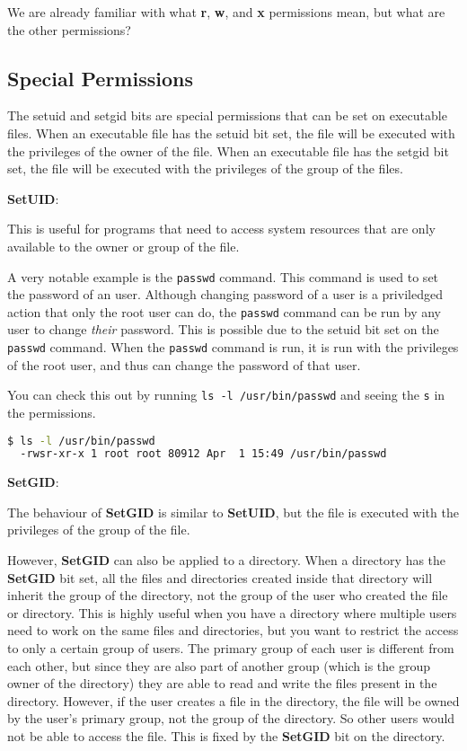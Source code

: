 We are already familiar with what
\textbf{r},
\textbf{w}, and
\textbf{x}
permissions mean, but what are the other permissions?

\subsection{Special Permissions}

\begin{definition}
  The setuid and setgid bits are special permissions that can be set on executable files.
  When an executable file has the setuid bit set, the file will be executed with the privileges of the owner of the file.
  When an executable file has the setgid bit set, the file will be executed with the privileges of the group of the files.
\end{definition}

\textbf{SetUID}:

This is useful for programs that need to access system resources that are only available to the owner or group of the file.

A very notable example is the \lstinline|passwd| command.
This command is used to set the password of an user.
Although changing password of a user is a priviledged action that only the root user can do, the \lstinline|passwd| command can be run by any user to change \textit{their} password.
This is possible due to the setuid bit set on the \lstinline|passwd| command.
When the \lstinline|passwd| command is run, it is run with the privileges of the root user, and thus can change the password of that user.

You can check this out by running \lstinline|ls -l /usr/bin/passwd| and seeing the \lstinline|s| in the permissions.

\begin{lstlisting}[language=bash]
  $ ls -l /usr/bin/passwd
  -rwsr-xr-x 1 root root 80912 Apr  1 15:49 /usr/bin/passwd
\end{lstlisting}

\textbf{SetGID}:

The behaviour of \textbf{SetGID} is similar to \textbf{SetUID}, but the file is executed with the privileges of the group of the file.

However, \textbf{SetGID} can also be applied to a directory.
When a directory has the \textbf{SetGID} bit set, all the files and directories created inside that directory will inherit the group of the directory, not the group of the user who created the file or directory.
This is highly useful when you have a directory where multiple users need to work on the same files and directories, but you want to restrict the access to only a certain group of users.
The primary group of each user is different from each other, but since they are also part of another group (which is the group owner of the directory) they are able to read and write the files present in the directory.
However, if the user creates a file in the directory, the file will be owned by the user's primary group, not the group of the directory.
So other users would not be able to access the file.
This is fixed by the \textbf{SetGID} bit on the directory.

